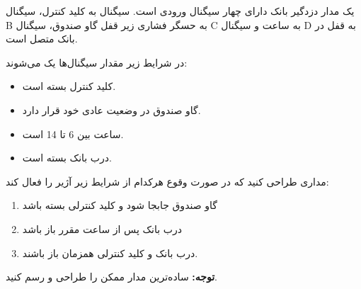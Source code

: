 یک مدار دزدگیر بانک دارای چهار سیگنال ورودی  است. سیگنال  به کلید کنترل، سیگنال B به حسگر فشاری زیر قفل گاو صندوق، سیگنال C به ساعت و سیگنال D به قفل در بانک متصل است.

در شرایط زیر مقدار سیگنال‌ها یک می‌شوند:
\begin{itemize}
	\item 
	 کلید کنترل بسته است.
	 
	 \item 
	 گاو صندوق در وضعیت عادی خود قرار دارد.
	 
	 \item 
	 ساعت بین 6 تا 14 است.
	 
	 \item 
	 درب بانک بسته است.
\end{itemize}

مداری طراحی کنید که در صورت وقوع هرکدام از شرایط زیر آژیر را فعال کند:
\begin{enumerate}
	\item 
	گاو صندوق جابجا شود و کلید کنترلی بسته باشد
	
	\item 
	درب بانک پس از ساعت مقرر باز باشد
	
	\item 
	درب بانک و کلید کنترلی همزمان باز باشند.
\end{enumerate}

\textbf{توجه:} ساده‌ترین مدار ممکن را طراحی و رسم کنید.